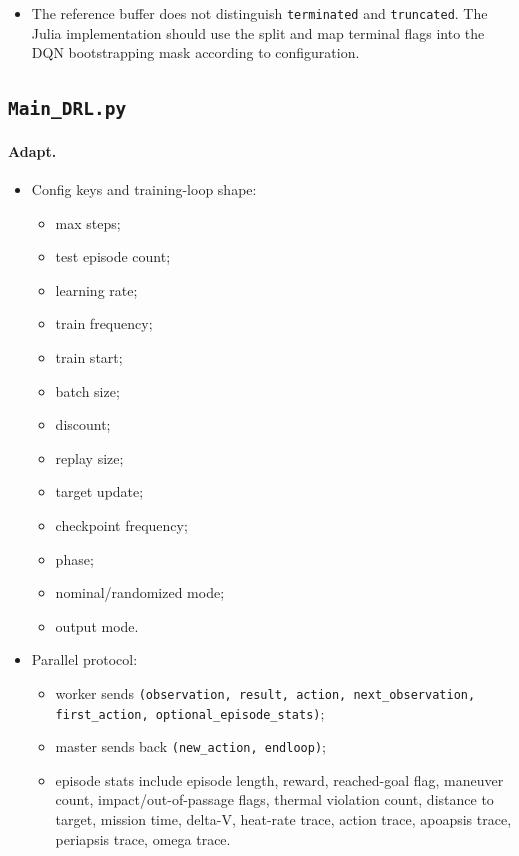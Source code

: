 \documentclass[11pt]{article}
\begin{document}
\begin{itemize}
\item The reference buffer does not distinguish \texttt{terminated} and \texttt{truncated}. The Julia implementation should use the split and map terminal flags into the DQN bootstrapping mask according to configuration.
\end{itemize}


\subsection{\texttt{Main\_DRL.py}}

\paragraph{Adapt.}

\begin{itemize}
\item Config keys and training-loop shape:
\begin{itemize}
\item max steps;
\item test episode count;
\item learning rate;
\item train frequency;
\item train start;
\item batch size;
\item discount;
\item replay size;
\item target update;
\item checkpoint frequency;
\item phase;
\item nominal/randomized mode;
\item output mode.

\end{itemize}
\item Parallel protocol:
\begin{itemize}
\item worker sends \texttt{(observation, result, action, next\_observation, first\_action, optional\_episode\_stats)};
\item master sends back \texttt{(new\_action, endloop)};
\item episode stats include episode length, reward, reached-goal flag, maneuver count, impact/out-of-passage flags, thermal violation count, distance to target, mission time, delta-V, heat-rate trace, action trace, apoapsis trace, periapsis trace, omega trace.
\end{itemize}
\end{itemize}
\end{document}
